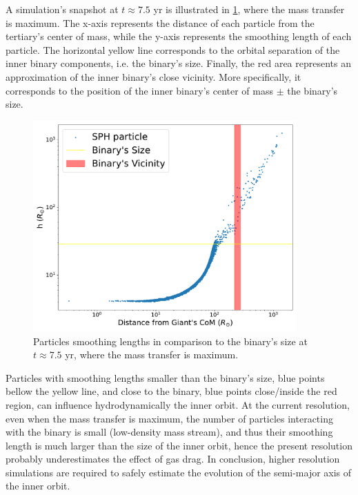 A simulation's snapshot at $t \approx 7.5$ yr is illustrated in \cref{fig:resolution}, where the mass transfer is maximum. The x-axis represents the distance of each particle from the tertiary's center of mass, while the y-axis represents the smoothing length of each particle. The horizontal yellow line corresponds to the orbital separation of the inner binary components, i.e. the binary's size. Finally, the red area represents an approximation of the inner binary's close vicinity. More specifically, it corresponds to the position of the inner binary's center of mass $\pm$ the binary's size.
\begin{figure}[!htb]
    \centering
    \includegraphics[width=0.9\textwidth]{Thesis/graphs/resolution_benchmark.pdf}
    \caption{Particles smoothing lengths in comparison to the binary's size at $t \approx 7.5$ yr, where the mass transfer is maximum.}
    \label{fig:resolution}
\end{figure}

Particles with smoothing lengths smaller than the binary's size, blue points bellow the yellow line, and close to the binary, blue points close/inside the red region, can influence hydrodynamically the inner orbit. At the current resolution, even when the mass transfer is maximum, the number of particles interacting with the binary is small (low-density mass stream), and thus their smoothing length is much larger than the size of the inner orbit, hence the present resolution probably underestimates the effect of gas drag. In conclusion, higher resolution simulations are required to safely estimate the evolution of the semi-major axis of the inner orbit.

